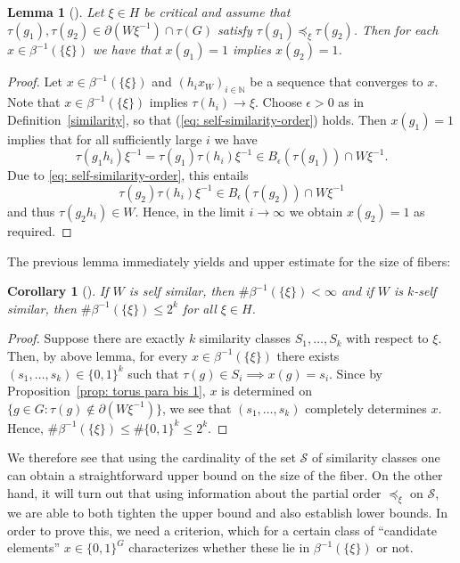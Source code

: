 \documentclass[titlepage,reqno,10pt]{amsart}
\newtheorem{lemma}[theorem]{Lemma}
\newtheorem{corollary}[theorem]{Corollary}
\theoremstyle{definition}
\begin{document}
\begin{lemma}[{\cite[Lemma 4.2]{FuGlJäOe21}}]\label{lem: if l_1 in Gamma then l_2}
    Let $\xi\in H$ be critical and assume that $\tau(g_1), \tau(g_2) \in \partial (W\xi^{-1})\cap \tau(G)$ satisfy $\tau(g_1)\preccurlyeq_{\xi} \tau(g_2)$. 
    Then for each $x\in\beta^{-1}(\{\xi\})$ we have that $x(g_1)=1$ implies $x(g_2)=1$.
\end{lemma}
\begin{proof}
Let $x\in \beta^{-1}(\{\xi\})$ and $(h_ix_W)_{i\in\mathbb{N}}$ be a sequence that converges to $x$. Note that $x\in\beta^{-1}(\{\xi\})$ implies $\tau(h_i)\to \xi$. Choose $\epsilon>0$ as in Definition~\ref{similarity}, so that (\ref{eq: self-similarity-order}) holds. Then $x(g_1)=1$ implies that for all sufficiently large $i$ we have $$\tau(g_1h_i)\xi^{-1}=\tau(g_1)\tau(h_i)\xi^{-1}\in B_\epsilon(\tau(g_1))\cap W\xi^{-1} . $$ Due to \eqref{eq: self-similarity-order}, this entails $$\tau(g_2)\tau(h_i)\xi^{-1}\in B_\epsilon(\tau(g_2))\cap W\xi^{-1} $$
and thus $\tau(g_2h_i)\in W$. Hence, in the limit $i\to\infty$ we obtain $x(g_2)=1$ as required. 
\end{proof}

The previous lemma immediately yields and upper estimate for the size of fibers:
\begin{corollary}[{\cite[Lemma 4.3]{FuGlJäOe21}}]\label{cor: number of fibers if self similar}
    If $W$ is self similar, then $\# \beta^{-1}(\{\xi\}) <\infty$ and if $W$ is $k$-self similar, then $\#\beta^{-1}(\{\xi\})\leq 2^k$ for all $\xi\in H$.
\end{corollary}
\begin{proof}
Suppose there are exactly $k$ similarity classes $S_1,\ldots, S_k$ with respect to $\xi$.
Then, by above lemma, for every $x\in \beta^{-1}(\{\xi\})$ there exists $(s_1,\ldots,s_k)\in\{0,1\}^k$ such that $\tau(g)\in S_i \implies x(g)=s_i$.
Since by Proposition~\ref{prop: torus para bis 1}, $x$ is determined on $\{g\in G: \tau(g) \notin \partial(W\xi^{-1})\}$, we see that $(s_1,\ldots,s_k)$ completely determines $x$.
Hence, $\#\beta^{-1}(\{\xi\})\leq \#\{0,1\}^k\leq 2^k$.
\end{proof}

We therefore see that using the cardinality of the set $\mathcal{S}$ of similarity classes one can obtain a straightforward upper bound on the size of the fiber.
On the other hand, it will turn out that using information about the partial order $\preccurlyeq_{\xi}$ on $\mathcal{S}$, we are able to both tighten the upper bound and also establish lower bounds.
In order to prove this, we need a criterion, which for a certain class of ``candidate elements'' $x\in \{0,1\}^G$ characterizes whether these lie in $\beta^{-1}(\{\xi\})$ or not.
 
\end{document}
